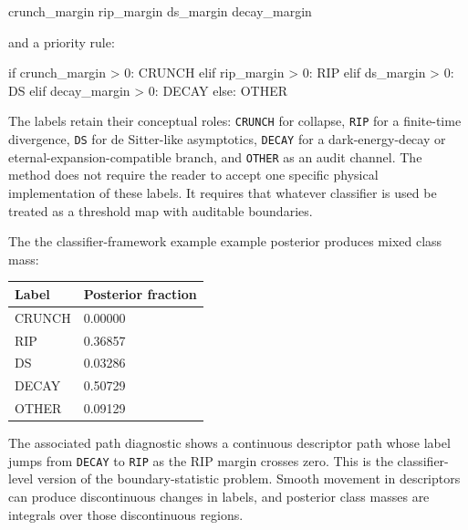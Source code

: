 \documentclass[
]{article}
\newenvironment{Shaded}{}{}
\newcommand{\NormalTok}[1]{#1}
\newcounter{none} %
\begin{document}
\begin{Shaded}
\begin{Highlighting}[]
\NormalTok{crunch\_margin}
\NormalTok{rip\_margin}
\NormalTok{ds\_margin}
\NormalTok{decay\_margin}
\end{Highlighting}
\end{Shaded}

and a priority rule:

\begin{Shaded}
\begin{Highlighting}[]
\NormalTok{if crunch\_margin \textgreater{} 0:}
\NormalTok{    CRUNCH}
\NormalTok{elif rip\_margin \textgreater{} 0:}
\NormalTok{    RIP}
\NormalTok{elif ds\_margin \textgreater{} 0:}
\NormalTok{    DS}
\NormalTok{elif decay\_margin \textgreater{} 0:}
\NormalTok{    DECAY}
\NormalTok{else:}
\NormalTok{    OTHER}
\end{Highlighting}
\end{Shaded}

The labels retain their conceptual roles: \texttt{CRUNCH} for collapse,
\texttt{RIP} for a finite-time divergence, \texttt{DS} for de
Sitter-like asymptotics, \texttt{DECAY} for a dark-energy-decay or
eternal-expansion-compatible branch, and \texttt{OTHER} as an audit
channel. The method does not require the reader to accept one specific
physical implementation of these labels. It requires that whatever
classifier is used be treated as a threshold map with auditable
boundaries.

The the classifier-framework example example posterior produces mixed
class mass:

{\def\LTcaptype{none} %
\begin{longtable}[]{@{}ll@{}}
\toprule\noalign{}
Label & Posterior fraction \\
\midrule\noalign{}
\endhead
\bottomrule\noalign{}
\endlastfoot
CRUNCH & 0.00000 \\
RIP & 0.36857 \\
DS & 0.03286 \\
DECAY & 0.50729 \\
OTHER & 0.09129 \\
\end{longtable}
}

The associated path diagnostic shows a continuous descriptor path whose
label jumps from \texttt{DECAY} to \texttt{RIP} as the RIP margin
crosses zero. This is the classifier-level version of the
boundary-statistic problem. Smooth movement in descriptors can produce
discontinuous changes in labels, and posterior class masses are
integrals over those discontinuous regions.
\end{document}
